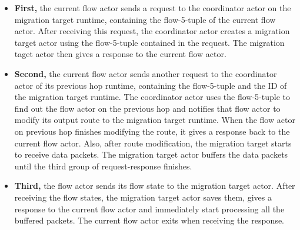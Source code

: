 \begin{itemize}


\item \textbf{First,} the current flow actor sends a request to the coordinator actor on the migration target runtime, containing the flow-5-tuple of the current flow actor. After receiving this request, the coordinator actor creates a migration target actor using the flow-5-tuple contained in the request. The migration taget actor then gives a response to the current flow actor.


\item \textbf{Second,} the current flow actor sends another request to the coordinator actor of its previous hop runtime, containing the flow-5-tuple and the ID of the migration target runtime. The coordinator actor uses the flow-5-tuple to find out the flow actor on the previous hop and notifies that flow actor to modify its output route to the migration target runtime. When the flow actor on previous hop finishes modifying the route, it gives a response back to the current flow actor. Also, after route modification, the migration target starts to receive data packets. The migration target actor buffers the data packets until the third group of request-response finishes.


\item \textbf{Third,} the flow actor sends its flow state to the migration target actor. After receiving the flow states, the migration target actor saves them, gives a response to the current flow actor and immediately start processing all the buffered packets. The current flow actor exits when receiving the response.

\end{itemize}

